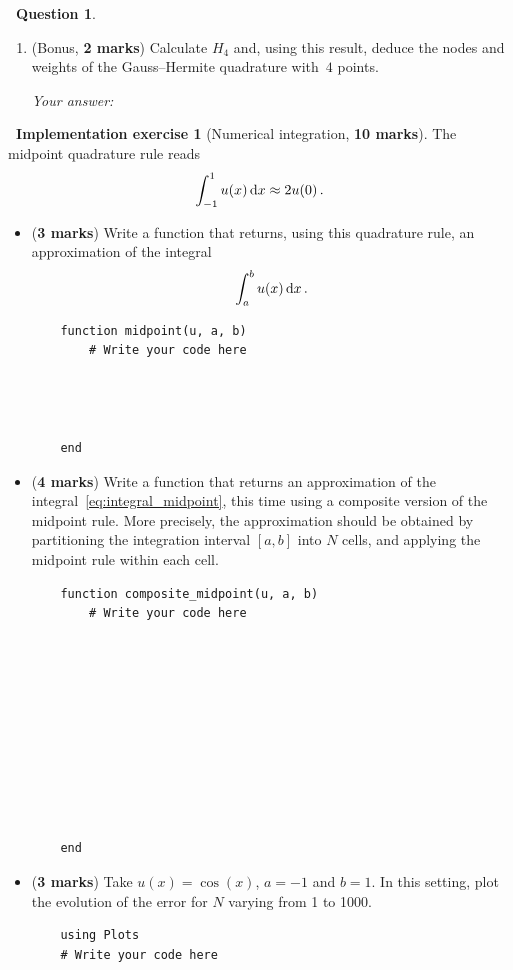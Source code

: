 \documentclass[10pt]{article}
\theoremstyle{definition}
\newtheorem{question}{{\normalfont \faGears}~Question}
\newtheorem{compexercise}{{\normalfont \faLaptop}~Implementation exercise}
\renewcommand{\mymarks}[1]{\textbf{#1 marks}}
\begin{document}
\begin{question}
\begin{enumerate}
    \textit{Your answer:}

\newpage
\vspace{10cm}
\item (Bonus, \mymarks{2})  
    Calculate $H_4$ and, using this result,
    deduce the nodes and weights of the Gauss--Hermite quadrature with~$4$ points.

    \textit{Your answer:}
\end{enumerate}
\end{question}
\newpage

\newpage
\begin{compexercise}
    [Numerical integration, \mymarks{10}]
    The midpoint quadrature rule reads
    \[
        \int_{-1}^{1} u(x) \, \mathrm d x
        \approx 2 u(0) \, .
    \]
    \begin{itemize}
        \item
            (\mymarks{3})
            Write a function  that returns, using this quadrature rule,
            an approximation of the integral 
            \begin{align}
                \label{eq:integral_midpoint}
                \int_{a}^{b} u(x) \, \mathrm d x \, .
            \end{align}

            \begin{verbatim}
    function midpoint(u, a, b)
        # Write your code here




    end
            \end{verbatim}

        \item
            (\mymarks{4})
            Write a function 
            that returns an approximation of the integral~\eqref{eq:integral_midpoint},
            this time using a composite version of the midpoint rule.
            More precisely, the approximation should be obtained
            by partitioning the integration interval $[a, b]$ into $N$ cells,
            and applying the midpoint rule within each cell.

            \begin{verbatim}
    function composite_midpoint(u, a, b)
        # Write your code here











    end
            \end{verbatim}

        \item
            (\mymarks{3})
            Take $u(x) = \cos(x)$, $a = -1$ and $b = 1$.
            In this setting, plot the evolution of the error for $N$ varying from 1 to 1000.

            \begin{verbatim}
    using Plots
    # Write your code here
            \end{verbatim}
    \end{itemize}
\end{compexercise}
\end{document}
